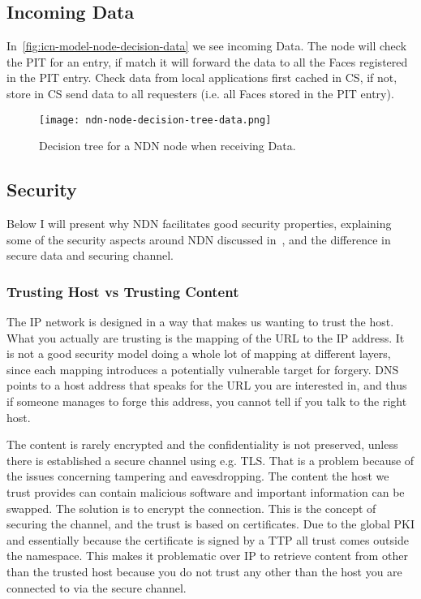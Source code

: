 \subsection{Incoming Data}
In~\autoref{fig:icn-model-node-decision-data} we see incoming Data.
The node will check  the \gls{PIT} for an entry, if match it will forward the data to all the Faces registered in the \gls{PIT} entry.
Check data from local applications first cached in \gls{CS}, if not, store in \gls{CS} send data to all requesters (i.e. all Faces stored in the \gls{PIT} entry).
\begin{figure}[H]
  \centering
  \texttt{[image: ndn-node-decision-tree-data.png]}
  \caption{Decision tree for a NDN node when receiving Data.}
  \label{fig:icn-model-node-decision-data}
\end{figure}


\subsection{Security}\label{ndn-security}
Below I will present why \gls{NDN} facilitates good security properties, explaining some of the security aspects around \gls{NDN} discussed in~\cite{secure-network-content}, and the difference in secure data and securing channel.

\subsubsection{Trusting Host vs Trusting Content}
The \gls{IP} network is designed in a way that makes us wanting to trust the host.
What you actually are trusting is the mapping of the \gls{URL} to the \gls{IP} address.
It is not a good security model doing a whole lot of mapping at different layers, since each mapping introduces a potentially vulnerable target for forgery.
\gls{DNS} points to a host address that speaks for the \gls{URL} you are interested in, and thus if someone manages to forge this address, you cannot tell if you talk to the right host.

The content is rarely encrypted and the confidentiality is not preserved, unless there is established a secure channel using e.g. \gls{TLS}.
That is a problem because of the issues concerning tampering and eavesdropping.
The content the host we trust provides can contain malicious software and important information can be swapped. 
The solution is to encrypt the connection. 
This is the concept of securing the channel, and the trust is based on certificates.
Due to the global \gls{PKI} and essentially because the certificate is signed by a \gls{TTP} all trust comes outside the namespace.
This makes it problematic over \gls{IP} to retrieve content from other than the trusted host because you do not trust any other than the host you are connected to via the secure channel.

